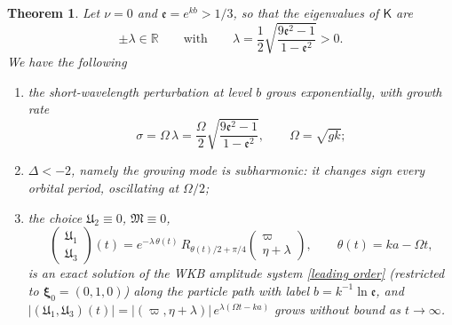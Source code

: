 \documentclass[reqno]{amsart}
\newcommand{\B}{{\mathfrak{M}}}
\newcommand{\ee}{\mathfrak{e}}
\newtheorem{theorem}{Theorem}
\begin{document}
\begin{theorem}\label{thm:neutral}
Let $\nu=0$ and $\ee=e^{kb}>1/3$, so that the eigenvalues of $\mathsf K$ are 
\begin{equation}
    \pm\lambda\in \mathbb{R} \qquad\text{with}\qquad\lambda=\frac{1}{2} \sqrt{\frac{9\ee^2-1}{1-\ee^2}}>0.
\end{equation}
We have the following
\begin{enumerate}
    \item[(i)] the short-wavelength perturbation at level $b$ grows exponentially, with growth rate
\begin{equation}\label{eq:sigma0}
\sigma=\Omega\,\lambda=\frac{\Omega}{2}\sqrt{\frac{9\ee^2-1}{1-\ee^2}},\qquad \Omega=\sqrt{gk};\end{equation}
\item[(ii)] $\Delta<-2$, namely the growing mode is subharmonic: it changes sign every orbital period, oscillating at $\Omega/2$;
\item[(iii)] the choice $\mathfrak{U}_2\equiv0$, $\B\equiv0$,
\begin{equation}\label{eq:explicit}
\begin{pmatrix}\mathfrak{U}_1\\\mathfrak{U}_3\end{pmatrix}(t)
=e^{-\lambda\,\theta(t)}\,R_{\theta(t)/2+\pi/4}\begin{pmatrix}\varpi\\\eta+\lambda\end{pmatrix},
\qquad \theta(t)=ka-\Omega t,
\end{equation}
is an exact solution of the WKB amplitude system \eqref{leading order} (restricted to $\boldsymbol\xi_0=(0,1,0)$) along the particle path with label $b=k^{-1}\ln\ee$, and $|(\mathfrak{U}_1,\mathfrak{U}_3)(t)|=|(\varpi,\eta+\lambda)|\,e^{\lambda(\Omega t-ka)}$ grows without bound as $t\to\infty$. 
\end{enumerate}
\end{theorem}
\end{document}
